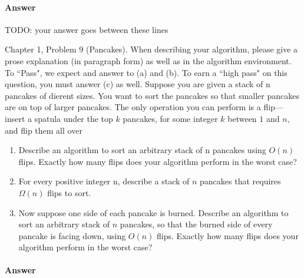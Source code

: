 \documentclass{article}
\begin{document}
\paragraph{Answer}


TODO: your answer goes between these lines



\nextprob
{}

Chapter 1, Problem 9 (Pancakes). When describing your algorithm, please give a
prose explanation (in paragraph form) as well as in the algorithm environment.
To ``Pass", we expect and answer to (a) and (b).  To earn a ``high pass" on this
question, you must answer (c) as well. \parspace
Suppose you are given a stack of n pancakes of dierent sizes.
You want to sort the pancakes so that smaller pancakes are on top of larger pancakes.
The only operation you can perform is a flip—insert a spatula under the top $k$ pancakes, for some integer $k$ between $1$ and $n$, and flip them all over

\begin{enumerate}[label=\alph*.]
    \item Describe an algorithm to sort an arbitrary stack of n pancakes using $O(n)$ flips.
    Exactly how many flips does your algorithm perform in the worst case?
    \item For every positive integer n, describe a stack of $n$ pancakes that requires $\Omega (n)$ flips to sort.
    \item Now suppose one side of each pancake is burned.
    Describe an algorithm to sort an arbitrary stack of $n$ pancakes, so that the burned side of every pancake is facing down, using $O(n)$ flips.
    Exactly how many flips does your algorithm perform in the worst case?
\end{enumerate}

\paragraph{Answer}

\end{document}
